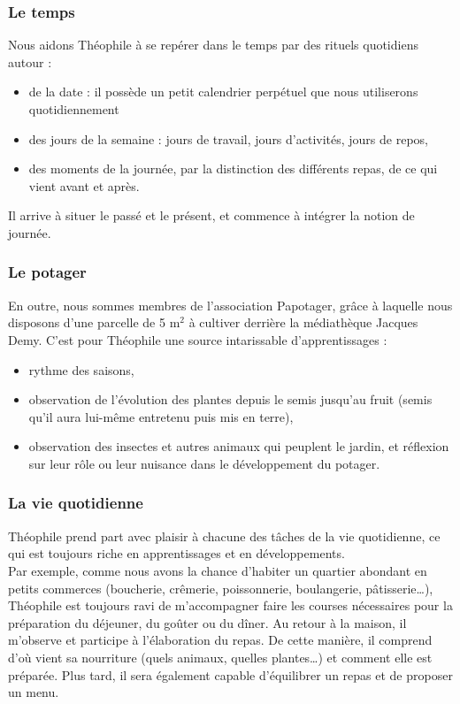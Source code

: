 \documentclass[french]{article}
\begin{document}
 \subsubsection{Le temps}
 
 Nous aidons Théophile à se repérer dans le temps par des rituels quotidiens autour :
 \begin{itemize}
 	\item de la date : il possède un petit calendrier perpétuel que nous utiliserons quotidiennement 
 	\item des jours de la semaine : jours de travail, jours d'activités, jours de repos,
 	\item des moments de la journée, par la distinction des différents repas, de ce qui vient avant et après.
 \end{itemize}
Il arrive à situer le passé et le présent, et commence à intégrer la notion de journée. \\
 
 \subsubsection{Le potager}
 En outre, nous sommes membres de l'association Papotager, grâce à laquelle nous disposons d'une parcelle de 5 m$^{2}$ à cultiver derrière la médiathèque Jacques Demy. C'est pour Théophile une source intarissable d'apprentissages :
 \begin{itemize}
 	\item rythme des saisons,
 	\item observation de l'évolution des plantes depuis le semis jusqu'au fruit (semis qu'il aura lui-même entretenu puis mis en terre),
 	\item observation des insectes et autres animaux qui peuplent le jardin, et réflexion sur leur rôle ou leur nuisance dans le développement du potager. 	
 \end{itemize}


 \subsubsection{La vie quotidienne}
Théophile prend part avec plaisir à chacune des tâches de la vie quotidienne, ce qui est toujours riche en apprentissages et en développements.\\

Par exemple, comme nous avons la chance d'habiter un quartier abondant en petits commerces (boucherie, crêmerie, poissonnerie, boulangerie, pâtisserie\ldots{}), Théophile est toujours ravi de m'accompagner faire les courses nécessaires pour la préparation du déjeuner, du goûter ou du dîner. Au retour à la maison, il m'observe et participe à l'élaboration du repas. De cette manière, il comprend d'où vient sa nourriture (quels animaux, quelles plantes\ldots{}) et  comment elle est préparée. Plus tard, il sera également capable d'équilibrer un repas et de proposer un menu.\\
\end{document}
